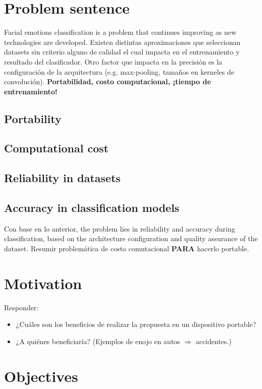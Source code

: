 \section{Problem sentence}

Facial emotions classification is a problem that continues improving as new technologies are developed. Existen distintas aproximaciones que seleccionan datasets sin criterio alguno de calidad el cual impacta en el entrenamiento y resultado del clasificador. Otro factor que impacta en la precisión es la configuración de la arquitectura (e.g. max-pooling, tamaños en kerneles de convolución). \textbf{Portabilidad, costo computacional, ¡tiempo de entrenamiento!}

\subsection{Portability}
\subsection{Computational cost}
\subsection{Reliability in datasets}
\subsection{Accuracy in classification models}

Con base en lo anterior, the problem lies in reliability and accuracy during classification, based on the architecture configuration and quality assurance of the dataset. Resumir problemática de costo comutacional \textbf{PARA} hacerlo portable.


\section{Motivation}

Responder:
\begin{itemize}
  \item ¿Cuáles son los beneficios de realizar la propuesta en un dispositivo portable?
  \item ¿A quiénes beneficiaría? (Ejemplos de enojo en autos $\Rightarrow$ accidentes.)
\end{itemize}


\section{Objectives}

